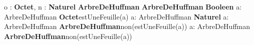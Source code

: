 \begin{algorithme}

    {o : \textbf{Octet}, n : \textbf{Naturel}}
    {\textbf{ArbreDeHuffman}}{}
     {\textbf{ArbreDeHuffman}}{}
    {\textbf{Booleen}}{}
    {a: ArbreDeHuffman}
    {\textbf{Octet}}{estUneFeuille(a)}
    {a: ArbreDeHuffman}
    {\textbf{Naturel}}{}
    {a: ArbreDeHuffman}
    {\textbf{ArbreDeHuffman}}{non(estUneFeuille(a))}
    {a: ArbreDeHuffman}
    {\textbf{ArbreDeHuffman}}{non(estUneFeuille(a))}
    
\end{algorithme}
